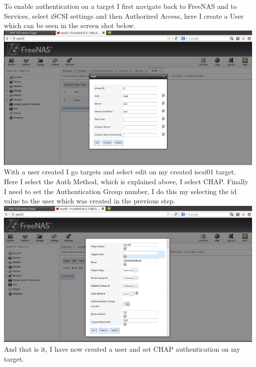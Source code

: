 To enable authentication on a target I first navigate back to FreeNAS and to Services, select iSCSI settings and then Authorized Access, here I create a User which can be seen in the screen shot below.
\\\includegraphics[width=\textwidth]{12.png}
With a user created I go targets and select edit on my created iscsi01 target. Here I select the Auth Method, which is explained above, I select CHAP. Finally I need to set the Authentication Group number, I do this my selecting the id value to the user which was created in the previous step.
\\\includegraphics[width=\textwidth]{13.png}
And that is it, I have now created a user and set CHAP authentication on my target.

